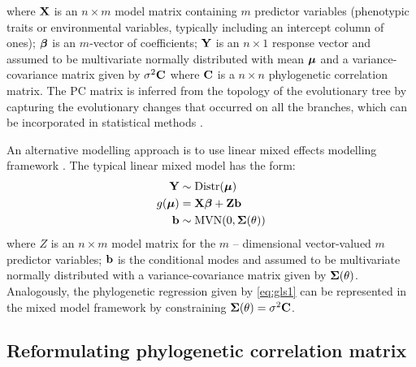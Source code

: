 where ${\mathbf X}$ is an $n \times m$ model matrix containing $m$ predictor variables (phenotypic traits or environmental variables, typically including an intercept column of ones); ${\boldsymbol \beta}$ is an $m$-vector of coefficients; ${\mathbf Y}$ is an $n \times 1$ response vector and assumed to be multivariate normally distributed with mean ${\boldsymbol \mu}$ and a variance-covariance matrix given by $\sigma^{2} {\mathbf C}$ where ${\mathbf C}$ is a $n \times n$ phylogenetic correlation matrix.
The PC matrix is inferred from the topology of the evolutionary tree by capturing the evolutionary changes that occurred on all the branches, which can be incorporated in statistical methods \citep{garamszegi2014modern}.


An alternative modelling approach is to use linear mixed effects modelling framework \citep{lynch1991methods}.
The typical linear mixed model has the form:
\begin{align}
{\mathbf Y} & \sim \textrm{Distr}({\boldsymbol \mu}) \label{eq:glmm1} \\
g({\boldsymbol \mu}) & = {\mathbf X} {\boldsymbol \beta} + {\mathbf Z} {\mathbf b} \label{eq:glmm2} \\
{\mathbf b} & \sim \textrm{MVN}(0, {\boldsymbol \Sigma}(\theta)) \label{eq:glmm3}
\end{align}
where $Z$ is an $n \times m$ model matrix for the $m$ -- dimensional vector-valued $m$ predictor variables; ${\mathbf b}$ is the conditional modes and assumed to be multivariate normally distributed with a variance-covariance matrix given by ${\boldsymbol \Sigma}(\theta)$.
Analogously, the phylogenetic regression given by \ref{eq:gls1} can be represented in the mixed model framework by constraining ${\boldsymbol \Sigma}(\theta) = \sigma^2 {\mathbf C}$.


\subsection{Reformulating phylogenetic correlation matrix}


